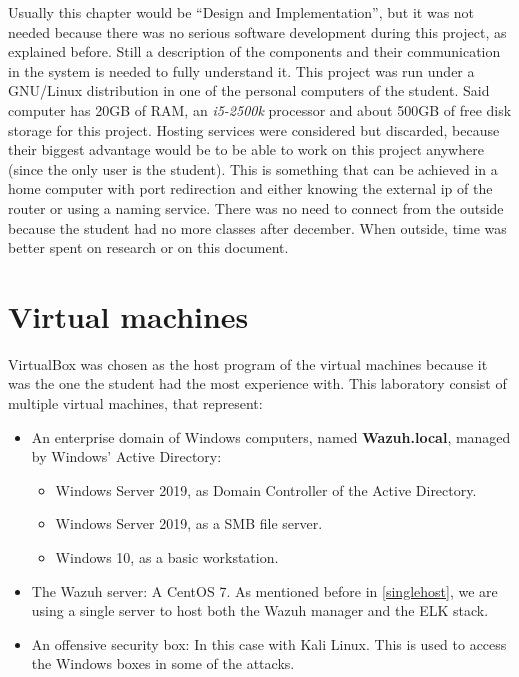 Usually this chapter would be ``Design and Implementation'', but it was not needed because there was no serious software development during this project, as explained before.
Still a description of the components and their communication in the system is needed to fully understand it.
\linej
\linej
This project was run under a GNU/Linux distribution in one of the personal computers of the student.
Said computer has 20GB of RAM, an \textit{i5-2500k} processor and about 500GB of free disk storage for this project.
\linej
\linej
Hosting services were considered but discarded, because their biggest advantage would be to be able to work on this project anywhere (since the only user is the student). This is something that can be achieved in a home computer with port redirection and either knowing the external ip of the router or using a naming service. There was no need to connect from the outside because the student had no more classes after december. When outside, time was better spent on research or on this document.

\section{Virtual machines}
VirtualBox was chosen as the host program of the virtual machines because it was the one the student had the most experience with.
\linej
This laboratory consist of multiple virtual machines, that represent:
\begin{itemize}
	\item An enterprise domain of Windows computers, named \textbf{Wazuh.local}, managed by Windows' Active Directory:
		\begin{itemize}
			\item Windows Server 2019, as Domain Controller of the Active Directory.
			\item Windows Server 2019, as a SMB file server.
			\item Windows 10, as a basic workstation.
		\end{itemize}
	\item The Wazuh server: A CentOS 7. As mentioned before in \ref{singlehost}, we are using a single server to host both the Wazuh manager and the ELK stack.
	\item An offensive security box: In this case with Kali Linux. This is used to access the Windows boxes in some of the attacks.
\end{itemize}

